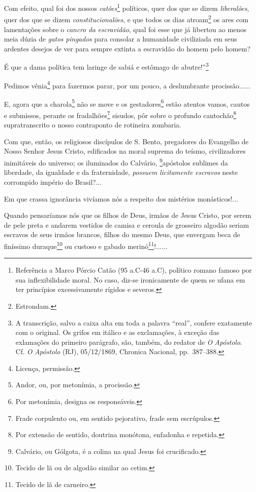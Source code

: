 Com efeito, qual foi dos nossos \emph{catões}\footnote{ Referência a
  Marco Pórcio Catão (95 a.C-46 a.C), político romano famoso por sua
  inflexibilidade moral. No caso, diz-se ironicamente de quem se ufana
  em ter princípios excessivamente rígidos e severos.} políticos, quer
dos que se dizem \emph{liberalões}, quer dos que se dizem
\emph{constitucionalões}, e que todos os dias atroam\footnote{
  Estrondam.} os ares com lamentações sobre o \emph{cancro da
escravidão}, qual foi esse que já libertou ao menos meia dúzia de
\emph{gatos pingados} para consolar a humanidade civiliziada em seus
ardentes desejos de ver para sempre extinta a escravidão do homem pelo
homem?

É que a dama política tem laringe de sabiá e estômago de
abutre!''\footnote{ A transcrição, salvo a caixa alta em toda a palavra
  ``real'', confere exatamente com o original. Os grifos em itálico e as
  exclamações, à exceção das exlamações do primeiro parágrafo, são,
  também, do redator de \emph{O} \emph{Apóstolo}. Cf. \emph{O Apóstolo}
  (RJ), 05/12/1869, Chronica Nacional, pp.~387--388.}

Pedimos vênia\footnote{ Licença, permissão.} para fazermos parar, por
um pouco, a deslumbrante procissão......

E, agora que a charola\footnote{ Andor, ou, por metonímia, a procissão.}
não se move e os gestadores\footnote{ Por metonímia, designa os
  responsáveis.} estão atentos vamos, cautos e submissos, perante os
fradalhões\footnote{ Frade corpulento ou, em sentido pejorativo, frade
  sem escrúpulos.} sisudos, pôr sobre o profundo cantochão\footnote{
  Por extensão de sentido, doutrina monótona, enfadonha e repetida.}
supratranscrito o nosso contraponto de rotineira zombaria.

Com que, então, os religiosos discípulos de S. Bento, pregadores do
Evangelho de Nosso Senhor Jesus Cristo, edificados na moral suprema do
teísmo, civilizadores inimitáveis do universo; os iluminados do
Calvário, \footnote{ Calvário, ou Gólgota, é a colina na qual Jesus foi
  crucificado.}apóstolos sublimes da liberdade, da igualdade e da
fraternidade, \emph{possuem licitamente escravos} neste corrompido
império do Brasil?...

Em que crassa ignorância vivíamos nós a respeito dos mistérios
monásticos!...

Quando pensaríamos nós que os filhos de Deus, irmãos de Jesus Cristo,
por serem de pele preta e andarem vestidos de camisa e ceroula de
grosseiro algodão seriam escravos de seus irmãos brancos, filhos do
mesmo Deus, que envergam beca de finíssimo duraque\footnote{ Tecido de
  lã ou de algodão similar ao cetim.} ou custoso e gabado
merinó\footnote{ Tecido de lã de carneiro.}!......

